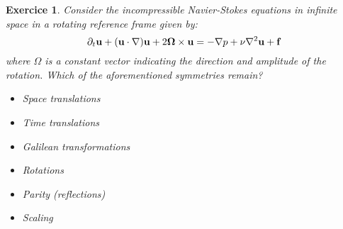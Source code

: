\documentclass[10pt,a4paper]{article}
\newtheorem{exercici}{Exercice}
\theoremstyle{definition}
\theoremstyle{remark}
\begin{document}
\begin{exercici}
  Consider the incompressible Navier-Stokes equations in infinite space in a rotating reference frame given by:
  \begin{equation*}
    \partial_t\boldsymbol{\mathrm{u}} + (\boldsymbol{\mathrm{u}}\cdot\nabla)\boldsymbol{\mathrm{u}} + 2\boldsymbol{\mathrm{\Omega}}\times\boldsymbol{\mathrm{u}} = -\nabla p + \nu\nabla^2\boldsymbol{\mathrm{u}} + \boldsymbol{\mathrm{f}}
  \end{equation*}
  where $\Omega$ is a constant vector indicating the direction and amplitude of the rotation. Which of the aforementioned symmetries remain?
  \begin{itemize}
    \item Space translations
    \item Time translations
    \item Galilean transformations
    \item Rotations
    \item Parity (reflections)
    \item Scaling
  \end{itemize}
\end{exercici}
\end{document}
